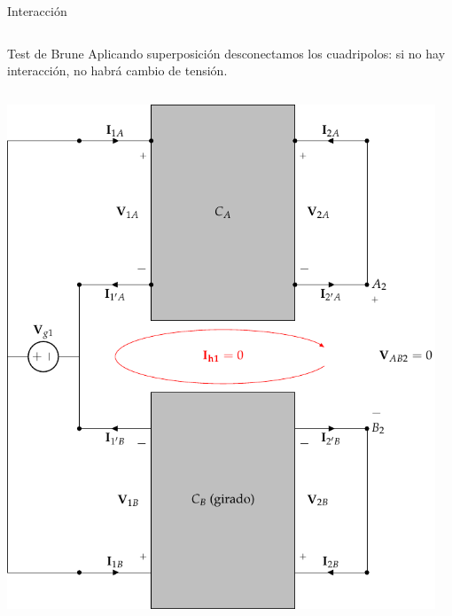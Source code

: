 \documentclass[xcolor={usenames,svgnames,dvipsnames}]{beamer}
\begin{document}
\begin{frame}[label={sec:org12088a9},plain]{Interacción}
\begin{columns}
\begin{column}{0.65\columnwidth}
\begin{center}
\end{center}
\end{column}
\end{columns}
\end{frame}

\begin{frame}[label={sec:org5d7984d},plain]{Test de Brune}
Aplicando superposición desconectamos los cuadripolos: \alert{si no hay interacción, no habrá cambio de tensión}.
\begin{columns}
\begin{column}{0.65\columnwidth}
\begin{center}
\includegraphics[width=.9\linewidth]{../figs/paralelo-paralelo-brune-entrada.pdf}
\end{center}
\end{column}
\begin{column}{0.65\columnwidth}
\begin{center}

\end{center}
\end{column}
\end{columns}
\end{frame}
\end{document}
